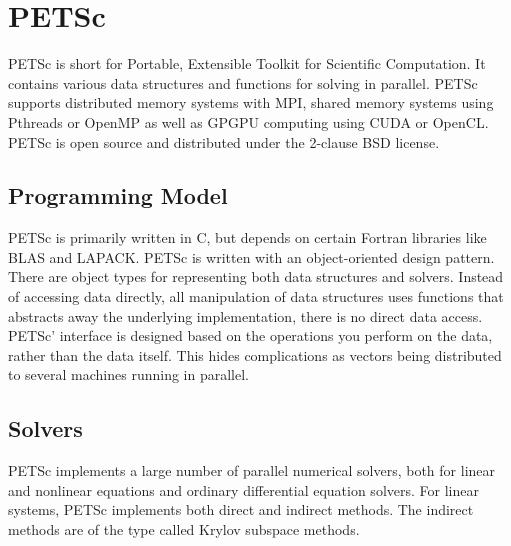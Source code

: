 \section{PETSc}

PETSc is short for Portable, Extensible Toolkit for Scientific Computation. 
It contains various data structures and functions for 
solving  in parallel. PETSc supports distributed 
memory systems with MPI, shared memory systems using Pthreads or OpenMP as well 
as GPGPU computing using CUDA or OpenCL. PETSc is open source and distributed 
under the 2-clause BSD license\cite{petsc-web-page}.

\subsection{Programming Model}
PETSc is primarily written in C, but depends on certain Fortran libraries like BLAS 
and LAPACK. PETSc is written with an object-oriented design pattern.
There are object types for representing both data structures and solvers.
Instead of accessing data directly, all manipulation of data structures uses functions
that abstracts away the underlying implementation, there is no direct data access. 
PETSc' interface is designed based on the operations you perform on the data, rather 
than the data itself. This hides complications as vectors being distributed to 
several machines running in parallel.

\subsection{Solvers}
PETSc implements a large number of parallel numerical solvers, both for linear and 
nonlinear equations and ordinary differential equation solvers. For linear systems, 
PETSc implements both direct and indirect methods. The indirect methods are of the 
type called Krylov subspace methods. 
